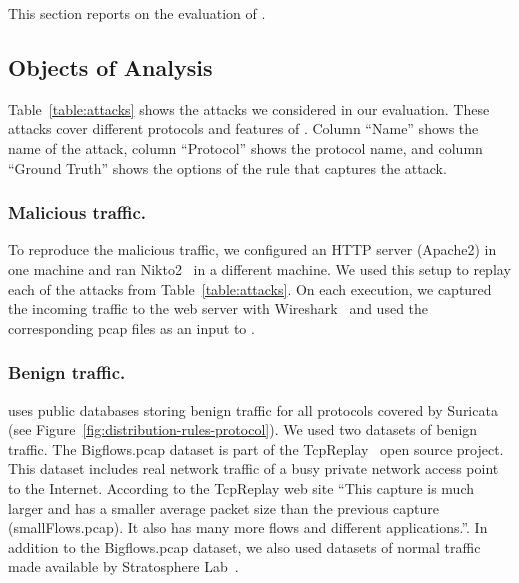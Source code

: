 \documentclass[sigconf,review, anonymous]{acmart}
\begin{document}
This section reports on the evaluation of \tname{}.

\subsection{Objects of Analysis}
\label{sec:dataset-benign}

Table~\ref{table:attacks} shows the attacks we considered in our
evaluation. These attacks cover different protocols and features of
\tname{}. Column ``Name'' shows the name of the attack, column
``Protocol'' shows the protocol name, and column ``Ground Truth''
shows the options of the rule that captures the attack.

\subsubsection{Malicious traffic.}To reproduce the malicious traffic, we
configured an HTTP server (Apache2) in one machine and ran
Nikto2~\cite{nikto} in a different machine. We used this setup to
replay each of the attacks from Table~\ref{table:attacks}.  On each
execution, we captured the incoming traffic to the web server with
Wireshark~\cite{wireshark-net-monitor} and used the corresponding pcap
files as an input to \tname.

\subsubsection{Benign traffic.}\tname{} uses public databases storing benign
traffic for all protocols covered by Suricata (see
Figure~\ref{fig:distribution-rules-protocol}). We used two datasets of
benign traffic. The Bigflows.pcap dataset is part of the
TcpReplay~\cite{tcpreplay} open source project. This dataset includes
real network traffic of a busy private network access point to the
Internet. According to the TcpReplay web site ``This capture is much
larger and has a smaller average packet size than the previous capture
(smallFlows.pcap). It also has many more flows and different
applications.''. In addition to the Bigflows.pcap dataset, we also
used datasets of normal traffic made available by Stratosphere
Lab~\cite{stratosphere-normal}.
\end{document}
